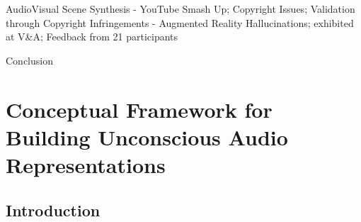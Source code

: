 \documentclass[a4paper,11pt,final]{ThesisStyle}
\begin{document}
AudioVisual Scene Synthesis
	- YouTube Smash Up; Copyright Issues; Validation through Copyright Infringements
	- Augmented Reality Hallucinations; exhibited at V\&A; Feedback from 21 participants

Conclusion








\chapter{Conceptual Framework for Building Unconscious Audio Representations}
\label{chap:framework-audio}
\minitoc

\section{Introduction}

\end{document}
